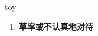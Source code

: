 
\begin{frame}
{\huge toy}
\begin{center}
\begin{enumerate}\Large
  \item \textbf{草率或不认真地对待}
\end{enumerate}
\end{center}
\end{frame}
